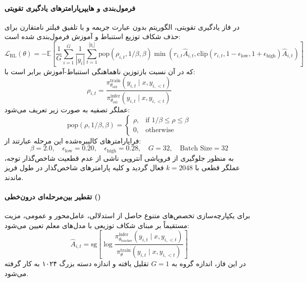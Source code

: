 \paragraph*{فرمول‌بندی و هایپرپارامترهای یادگیری تقویتی }
در فاز یادگیری تقویتی، الگوریتم  \cite{shao2024deepseekmath} بدون عبارت جریمه  و با تلفیق فیلتر نامتقارن  برای حذف شکاف توزیع استنباط و آموزش فرمول‌بندی شده است:
\begin{equation}
    \mathcal{L}_{\text{RL}}(\theta) = -\mathbb{E} \left[ \frac{1}{G} \sum_{i=1}^G \frac{1}{|y_i|} \sum_{t=1}^{|y_i|} \text{pop}(\rho_{i,t}, 1/\beta, \beta) \min\left(r_{i,t}\hat{A}_{i,t}, \text{clip}(r_{i,t}, 1-\epsilon_{\text{low}}, 1+\epsilon_{\text{high}})\hat{A}_{i,t}\right) \right]
\end{equation}
که در آن نسبت بازتوزین ناهماهنگی استنباط-آموزش برابر است با:
\begin{equation}
    \rho_{i,t} = \frac{\pi_{\theta_{\text{old}}}^{\text{train}}(y_{i,t} \mid x, y_{i,<t})}{\pi_{\theta_{\text{old}}}^{\text{infer}}(y_{i,t} \mid x, y_{i,<t})}
\end{equation}
عملگر تصفیه  به صورت زیر تعریف می‌شود:
\begin{equation}
    \text{pop}(\rho, 1/\beta, \beta) = \begin{cases} \rho, & \text{if } 1/\beta \le \rho \le \beta \\ 0, & \text{otherwise} \end{cases}
\end{equation}
فراپارامترهای کالیبره‌شده این مرحله عبارتند از:
\begin{equation}
    \beta = 2.0, \quad \epsilon_{\text{low}} = 0.20, \quad \epsilon_{\text{high}} = 0.28, \quad G = 32, \quad \text{Batch Size} = 32
\end{equation}
به منظور جلوگیری از فروپاشی آنتروپی ناشی از عدم قطعیت شاخص‌گذار توجه، عملگر قطعی  با $k=2048$ فعال گردید و کلیه پارامترهای شاخص‌گذار در طول  فریز ماندند.

\paragraph*{تقطیر بین‌مرحله‌ای درون‌خطی ()}
برای یکپارچه‌سازی تخصص‌های متنوع حاصل از  استدلالی، عامل‌محور و عمومی، مزیت مستقیماً بر مبنای شکاف توزیعی با مدل‌های معلم تعیین می‌شود:
\begin{equation}
    \hat{A}_{i,t} = \text{sg}\left[ \log \frac{\pi_{\theta_{\text{teacher}}}^{\text{infer}}(y_{i,t} \mid x, y_{i,<t})}{\pi_{\theta}^{\text{train}}(y_{i,t} \mid x, y_{i,<t})} \right]
\end{equation}
در این فاز، اندازه گروه به $G=1$ تقلیل یافته و اندازه دسته بزرگ ۱۰۲۴ به کار گرفته می‌شود.

